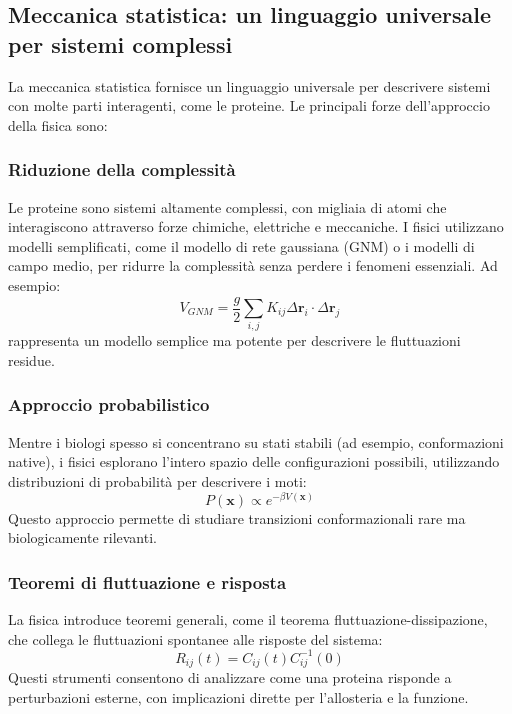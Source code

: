 \documentclass[Lau,binding=0.6cm,oneside,noexaminfo]{sapthesis}
\begin{document}
\subsection{Meccanica statistica: un linguaggio universale per sistemi complessi}
La meccanica statistica fornisce un linguaggio universale per descrivere sistemi con molte parti interagenti, come le proteine. Le principali forze dell'approccio della fisica sono:

\subsubsection{Riduzione della complessità}
Le proteine sono sistemi altamente complessi, con migliaia di atomi che interagiscono attraverso forze chimiche, elettriche e meccaniche. I fisici utilizzano modelli semplificati, come il modello di rete gaussiana (GNM) o i modelli di campo medio, per ridurre la complessità senza perdere i fenomeni essenziali. Ad esempio:
\[
V_{GNM} = \frac{g}{2} \sum_{i,j} K_{ij} \Delta \mathbf{r}_i \cdot \Delta \mathbf{r}_j
\]
rappresenta un modello semplice ma potente per descrivere le fluttuazioni residue.

\subsubsection{Approccio probabilistico}
Mentre i biologi spesso si concentrano su stati stabili (ad esempio, conformazioni native), i fisici esplorano l'intero spazio delle configurazioni possibili, utilizzando distribuzioni di probabilità per descrivere i moti:
\[
P(\mathbf{x}) \propto e^{-\beta V(\mathbf{x})}
\]
Questo approccio permette di studiare transizioni conformazionali rare ma biologicamente rilevanti.

\subsubsection{Teoremi di fluttuazione e risposta}
La fisica introduce teoremi generali, come il teorema fluttuazione-dissipazione, che collega le fluttuazioni spontanee alle risposte del sistema:
\[
R_{ij}(t) = C_{ij}(t) C^{-1}_{ij}(0)
\]
Questi strumenti consentono di analizzare come una proteina risponde a perturbazioni esterne, con implicazioni dirette per l'allosteria e la funzione.
\end{document}
